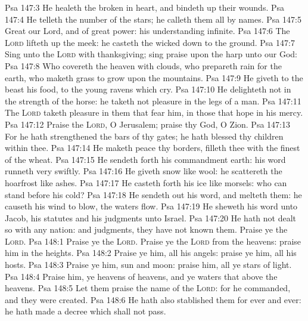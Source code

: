 \vs Psa 147:3 He healeth the broken in heart, and bindeth up their wounds.
\vs Psa 147:4 He telleth the number of the stars; he calleth them all by  names.
\vs Psa 147:5 Great  our Lord, and of great power: his understanding  infinite.
\vs Psa 147:6 The \textsc{Lord} lifteth up the meek: he casteth the wicked down to the ground.
\vs Psa 147:7 Sing unto the \textsc{Lord} with thanksgiving; sing praise upon the harp unto our God:
\vs Psa 147:8 Who covereth the heaven with clouds, who prepareth rain for the earth, who maketh grass to grow upon the mountains.
\vs Psa 147:9 He giveth to the beast his food,  to the young ravens which cry.
\vs Psa 147:10 He delighteth not in the strength of the horse: he taketh not pleasure in the legs of a man.
\vs Psa 147:11 The \textsc{Lord} taketh pleasure in them that fear him, in those that hope in his mercy.
\vs Psa 147:12 Praise the \textsc{Lord}, O Jerusalem; praise thy God, O Zion.
\vs Psa 147:13 For he hath strengthened the bars of thy gates; he hath blessed thy children within thee.
\vs Psa 147:14 He maketh peace  thy borders,  filleth thee with the finest of the wheat.
\vs Psa 147:15 He sendeth forth his commandment  earth: his word runneth very swiftly.
\vs Psa 147:16 He giveth snow like wool: he scattereth the hoarfrost like ashes.
\vs Psa 147:17 He casteth forth his ice like morsels: who can stand before his cold?
\vs Psa 147:18 He sendeth out his word, and melteth them: he causeth his wind to blow,  the waters flow.
\vs Psa 147:19 He sheweth his word unto Jacob, his statutes and his judgments unto Israel.
\vs Psa 147:20 He hath not dealt so with any nation: and  judgments, they have not known them. Praise ye the \textsc{Lord}.
\vs Psa 148:1 Praise ye the \textsc{Lord}. Praise ye the \textsc{Lord} from the heavens: praise him in the heights.
\vs Psa 148:2 Praise ye him, all his angels: praise ye him, all his hosts.
\vs Psa 148:3 Praise ye him, sun and moon: praise him, all ye stars of light.
\vs Psa 148:4 Praise him, ye heavens of heavens, and ye waters that  above the heavens.
\vs Psa 148:5 Let them praise the name of the \textsc{Lord}: for he commanded, and they were created.
\vs Psa 148:6 He hath also stablished them for ever and ever: he hath made a decree which shall not pass.
